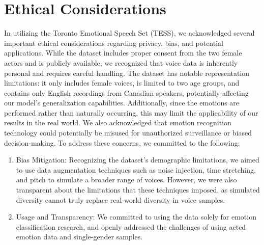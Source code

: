 \documentclass[../main.tex]{subfiles}
\begin{document}
\section{Ethical Considerations}
In utilizing the Toronto Emotional Speech Set (TESS), we acknowledged several 
important ethical considerations regarding privacy, bias, and potential 
applications. While the dataset includes proper consent from the two female 
actors and is publicly available, we recognized that voice data is inherently 
personal and requires careful handling. The dataset has notable representation 
limitations: it only includes female voices, is limited to two age groups, and 
contains only English recordings from Canadian speakers, potentially affecting 
our model's generalization capabilities. Additionally, since the emotions are 
performed rather than naturally occurring, this may limit the applicability of 
our results in the real world. We also acknowledged that emotion recognition 
technology could potentially be misused for unauthorized surveillance or biased 
decision-making. To address these concerns, we committed to the following: 

\begin{enumerate}
    \item Bias Mitigation: Recognizing the dataset's demographic limitations, we aimed to 
    use data augmentation techniques such as noise injection, time stretching, 
    and pitch to simulate a broader range of voices. However, 
    we were also transparent about the limitations that these techniques imposed, as 
    simulated diversity cannot truly replace real-world diversity in voice samples.

    \item Usage and Transparency: We committed to using the data solely for emotion 
    classification research, and openly addressed the challenges of using acted 
    emotion data and single-gender samples.    
\end{enumerate}
\end{document}
